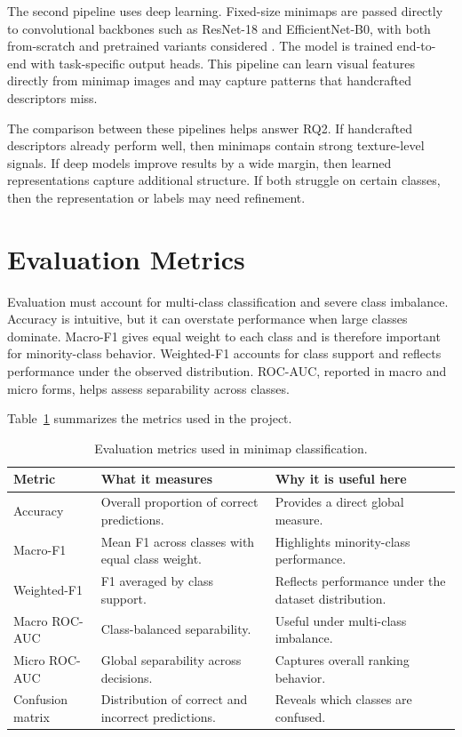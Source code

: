 The second pipeline uses deep learning. Fixed-size minimaps are passed directly
to convolutional backbones such as ResNet-18 and EfficientNet-B0, with both
from-scratch and pretrained variants considered \cite{he2016resnet,tan2019efficientnet,gebara2025ciarp}.
The model is trained end-to-end with task-specific output heads. This pipeline
can learn visual features directly from minimap images and may capture patterns
that handcrafted descriptors miss.

The comparison between these pipelines helps answer RQ2. If handcrafted
descriptors already perform well, then minimaps contain strong texture-level
signals. If deep models improve results by a wide margin, then learned
representations capture additional structure. If both struggle on certain
classes, then the representation or labels may need refinement.

\section{Evaluation Metrics}

Evaluation must account for multi-class classification and severe class
imbalance. Accuracy is intuitive, but it can overstate performance when large
classes dominate. Macro-F1 gives equal weight to each class and is therefore
important for minority-class behavior. Weighted-F1 accounts for class support and
reflects performance under the observed distribution. ROC-AUC, reported in macro
and micro forms, helps assess separability across classes.

Table~\ref{tab:metrics} summarizes the metrics used in the project.

\begin{table}[ht]
\centering
\caption{Evaluation metrics used in minimap classification.}
\label{tab:metrics}
\begin{tabular}{p{}p{}p{}}
\toprule
\textbf{Metric} & \textbf{What it measures} & \textbf{Why it is useful here} \\
\midrule
Accuracy & Overall proportion of correct predictions. & Provides a direct global measure. \\
Macro-F1 & Mean F1 across classes with equal class weight. & Highlights minority-class performance. \\
Weighted-F1 & F1 averaged by class support. & Reflects performance under the dataset distribution. \\
Macro ROC-AUC & Class-balanced separability. & Useful under multi-class imbalance. \\
Micro ROC-AUC & Global separability across decisions. & Captures overall ranking behavior. \\
Confusion matrix & Distribution of correct and incorrect predictions. & Reveals which classes are confused. \\
\bottomrule
\end{tabular}
\fautor
\end{table}


